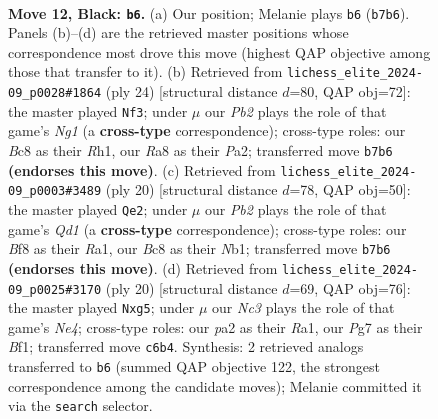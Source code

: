 \documentclass[11pt]{article}
\begin{document}
\clearpage

\begin{figure}[p]\centering
\begin{subfigure}{0.46\textwidth}\centering
\resizebox{\linewidth}{!}{%
\newchessgame
\chessboard[
  setfen={r1bqkb1r/pp3ppp/2n5/3pP3/7P/5N2/PP3PPK/RNBQ1R2 b q - 0 12},
  showmover=false,
  pgfstyle=straightmove, color=movearrow, markmove={b7-b6}
]}
\caption{}
\end{subfigure}\hfill
\begin{subfigure}{0.46\textwidth}\centering
\resizebox{\linewidth}{!}{%
\newchessgame
\chessboard[
  setfen={r2qr1k1/pp3ppp/5n2/3pbb2/8/2P1B2P/PP2BPP1/R2QK1NR w KQ - 0 13},
  showmover=false,
  pgfstyle=straightmove, color=movearrow, markmove={g1-f3}
]}
\caption{}
\end{subfigure}
\\[4pt]
\begin{subfigure}{0.46\textwidth}\centering
\resizebox{\linewidth}{!}{%
\newchessgame
\chessboard[
  setfen={rn1q1rk1/pp2p1bp/2p2np1/8/2pP4/5B2/PP3PPP/RNBQ1RK1 w - - 0 11},
  showmover=false,
  pgfstyle=straightmove, color=movearrow, markmove={d1-e2}
]}
\caption{}
\end{subfigure}\hfill
\begin{subfigure}{0.46\textwidth}\centering
\resizebox{\linewidth}{!}{%
\newchessgame
\chessboard[
  setfen={r1bqk1nr/ppp2pp1/2n1p3/6p1/3PN3/P3B3/1PP2P1P/R2QKB1R w KQkq - 0 11},
  showmover=false,
  pgfstyle=straightmove, color=movearrow, markmove={e4-g5}
]}
\caption{}
\end{subfigure}
\caption{\textbf{Move 12, Black: \texttt{b6}.} (a) Our position; Melanie plays \texttt{b6} (\texttt{b7b6}). Panels (b)--(d) are the retrieved master positions whose correspondence most drove this move (highest QAP objective among those that transfer to it). (b) Retrieved from \texttt{lichess\_elite\_2024-09\_p0028\#1864} (ply 24) [structural distance $d$=80, QAP obj=72]: the master played \texttt{Nf3}; under $\mu$ our \emph{Pb2} plays the role of that game's \emph{Ng1} (a \textbf{cross-type} correspondence); cross-type roles: our \emph{B}c8 as their \emph{R}h1, our \emph{R}a8 as their \emph{P}a2; transferred move \texttt{b7b6} \textbf{(endorses this move)}. (c) Retrieved from \texttt{lichess\_elite\_2024-09\_p0003\#3489} (ply 20) [structural distance $d$=78, QAP obj=50]: the master played \texttt{Qe2}; under $\mu$ our \emph{Pb2} plays the role of that game's \emph{Qd1} (a \textbf{cross-type} correspondence); cross-type roles: our \emph{B}f8 as their \emph{R}a1, our \emph{B}c8 as their \emph{N}b1; transferred move \texttt{b7b6} \textbf{(endorses this move)}. (d) Retrieved from \texttt{lichess\_elite\_2024-09\_p0025\#3170} (ply 20) [structural distance $d$=69, QAP obj=76]: the master played \texttt{Nxg5}; under $\mu$ our \emph{Nc3} plays the role of that game's \emph{Ne4}; cross-type roles: our \emph{p}a2 as their \emph{R}a1, our \emph{P}g7 as their \emph{B}f1; transferred move \texttt{c6b4}. Synthesis: 2 retrieved analogs transferred to \texttt{b6} (summed QAP objective 122, the strongest correspondence among the candidate moves); Melanie committed it via the \texttt{search} selector.}
\label{fig:thought-m23}
\end{figure}
\end{document}
